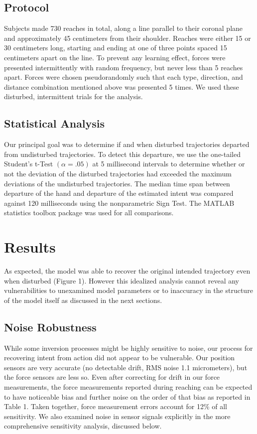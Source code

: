 \subsection*{Protocol}
Subjects made 730 reaches in total, along a line parallel to their coronal plane and approximately 45 centimeters from their shoulder. Reaches were either 15 or 30 centimeters long, starting and ending at one of three points spaced 15 centimeters apart on the line. To prevent any learning effect, forces were presented intermittently with random frequency, but never less than 5 reaches apart. Forces were chosen pseudorandomly such that each type, direction, and distance combination mentioned above was presented 5 times. We used these disturbed, intermittent trials for the analysis. 

\subsection*{Statistical Analysis}
Our principal goal was to determine if and when disturbed trajectories departed from undisturbed trajectories. To detect this departure, we use the one-tailed Student's t-Test $(\alpha=.05)$ at 5 millisecond intervals to determine whether or not the deviation of the disturbed trajectories had exceeded the maximum deviations of the undisturbed trajectories. The median time span between departure of the hand and departure of the estimated intent was compared against 120 milliseconds using the nonparametric Sign Test. The MATLAB statistics toolbox package \cite{MATLAB:2008} was used for all comparisons.

\section*{Results}
As expected, the model was able to recover the original intended trajectory even when disturbed (Figure 1). However this idealized analysis cannot reveal any vulnerabilities to unexamined model parameters or to inaccuracy in the structure of the model itself as discussed in the next sections.

\subsection*{Noise Robustness}
While some inversion processes might be highly sensitive to noise, our process for recovering intent from action did not appear to be vulnerable. Our position sensors are very accurate (no detectable drift, RMS noise 1.1 micrometers), but the force sensors are less so. Even after correcting for drift in our force measurements, the force measurements reported during reaching can be expected to have noticeable bias and further noise on the order of that bias as reported in Table 1. Taken together, force measurement errors account for 12\% of all sensitivity. We also examined noise in sensor signals explicitly in the more comprehensive sensitivity analysis, discussed below.

